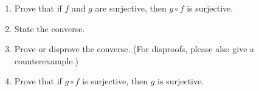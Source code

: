\documentclass{amsart}
\begin{document}
  \begin{enumerate}
  \item Prove that  if $f$ and $g$ are surjective, then $g\circ f$ is surjective.
  \item State the converse. 
  \item Prove or disprove the converse. (For disproofs, please also give a counterexample.)
  \item Prove that if $g\circ f$ is surjective, then $g$ is surjective.
   \end{enumerate}




\end{document}
